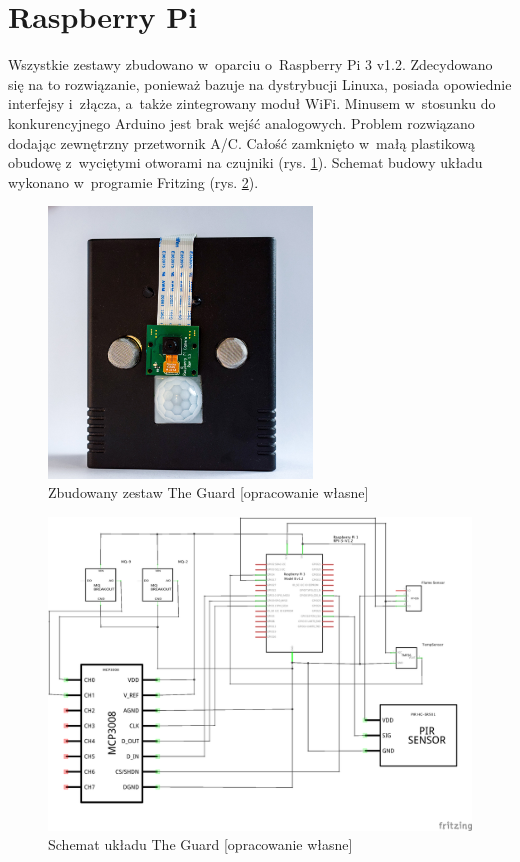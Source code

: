 \documentclass[polish,bachelor,a4paper,oneside]{ppfcmthesis}
\begin{document}
    \section{Raspberry Pi}
    Wszystkie zestawy zbudowano w~oparciu o~Raspberry Pi 3 v1.2. Zdecydowano się na to rozwiązanie, ponieważ bazuje na dystrybucji Linuxa, posiada opowiednie interfejsy i~złącza, a~także zintegrowany moduł WiFi. Minusem w~stosunku do konkurencyjnego Arduino jest brak wejść analogowych. Problem rozwiązano dodając zewnętrzny przetwornik A/C. Całość zamknięto w~małą plastikową obudowę z~wyciętymi otworami na czujniki (rys. \ref{the_guard_set}). Schemat budowy układu wykonano w~programie Fritzing (rys. \ref{the_guard_schem}).
    \begin{figure}[H]
        \centering
        \includegraphics[width=7cm]{guard.jpg}
        \caption{Zbudowany zestaw The Guard [opracowanie własne]}
        \label{the_guard_set}
    \end{figure}
    \begin{figure}[H]
        \centering
        \includegraphics[width=15cm]{GuardSchem}
        \caption{Schemat układu The Guard [opracowanie własne]}
        \label{the_guard_schem}
    \end{figure}
\end{document}
